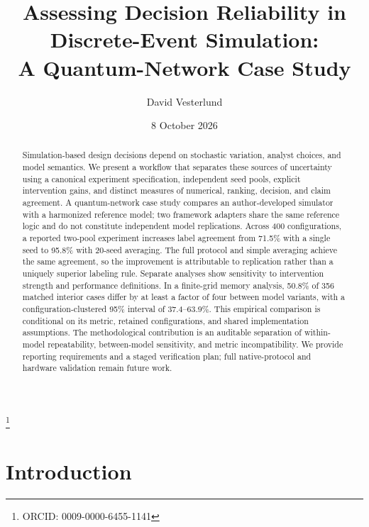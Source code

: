 \documentclass[aps,prapplied,reprint,superscriptaddress]{revtex4-2}
\begin{document}
\title{Assessing Decision Reliability in Discrete-Event Simulation:\\A Quantum-Network Case Study}

\author{David Vesterlund}

\date{8 October 2026}

\thanks{ORCID: 0009-0000-6455-1141}

\begin{abstract}
Simulation-based design decisions depend on stochastic variation, analyst choices, and model semantics. We present a workflow that separates these sources of uncertainty using a canonical experiment specification, independent seed pools, explicit intervention gains, and distinct measures of numerical, ranking, decision, and claim agreement. A quantum-network case study compares an author-developed simulator with a harmonized reference model; two framework adapters share the same reference logic and do not constitute independent model replications. Across 400 configurations, a reported two-pool experiment increases label agreement from 71.5\% with a single seed to 95.8\% with 20-seed averaging. The full protocol and simple averaging achieve the same agreement, so the improvement is attributable to replication rather than a uniquely superior labeling rule. Separate analyses show sensitivity to intervention strength and performance definitions. In a finite-grid memory analysis, 50.8\% of 356 matched interior cases differ by at least a factor of four between model variants, with a configuration-clustered 95\% interval of 37.4--63.9\%. This empirical comparison is conditional on its metric, retained configurations, and shared implementation assumptions. The methodological contribution is an auditable separation of within-model repeatability, between-model sensitivity, and metric incompatibility. We provide reporting requirements and a staged verification plan; full native-protocol and hardware validation remain future work.
\end{abstract}

\maketitle

\section{Introduction}
\label{sec:intro}
\end{document}
